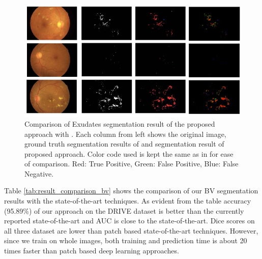 \documentclass[utf8]{FrontiersinHarvard} %
\begin{document}
\begin{figure}[ht!]
\begin{center}
\includegraphics[width=15cm]{images/exudates_comparison.jpg} %
\end{center}
\caption{Comparison of Exudates segmentation result of the proposed approach with \cite{guo2020bin}. Each column from left shows the original image, ground truth segmentation results of \cite{guo2020bin} and segmentation result of proposed approach. Color code used is kept the same as in \cite{guo2020bin} for ease of comparison. Red: True Positive, Green: False Positive, Blue: False Negative.}
\label{fig:exudates_comparison}
\end{figure}


Table \ref{tab:result_comparison_bv} shows the comparison of our BV segmentation results with the state-of-the-art techniques. As evident from the table accuracy (95.89\%) of our approach on the DRIVE dataset is better than the currently reported state-of-the-art and AUC is close to the state-of-the-art. Dice scores on all three dataset are lower than patch based state-of-the-art techniques. However, since we train on whole images, both training and prediction time is about 20 times faster than patch based deep learning approaches.
\end{document}
